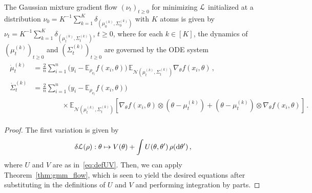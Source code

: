 \documentclass{custom}
\begin{document}
\begin{theorem} \label{thm:regression-gaussian-gmm}
The Gaussian mixture gradient
flow $(\nu_{t})_{t\geq0}$ for minimizing $\EuScript{L}$ initialized at a
distribution $\nu_{0}=K^{-1}\sum_{k=1}^{K}\delta_{(\mu_{0}^{(k)},\Sigma_{0}^{(k)})}$
with $K$ atoms is given by $\nu_{t}= K^{-1} \sum_{k=1}^{K}\delta_{(\mu_t^{(k)},\Sigma_t^{(k)})}$, $t\ge 0$,
where for each $k\in[K]$, the dynamics of $(\mu_{t}^{(k)})_{t\geq0}$
and $(\Sigma_{t}^{(k)})_{t\geq0}$ are governed by the ODE system
\begin{align*}
\boxed{\begin{aligned}
\dot{\mu}_{t}^{(k)} & =\frac{2}{n}\sum_{i=1}^{n}\bigl(y_{i}-\mathbb{E}_{\rho_{\nu_{t}}} f(x_{i},\theta)\bigr)\,\mathbb{E}_{\mathcal{N}(\mu_{t}^{(k)},\Sigma_{t}^{(k)})} \nabla_{\theta}f(x_{i},\theta)\,,\\
\dot{\Sigma}_{t}^{(k)} & =\frac{2}{n}\sum_{i=1}^{n}\bigl(y_{i}-\mathbb{E}_{\rho_{\nu_{t}}} f(x_{i},\theta)\bigr)\\
&\qquad\qquad{}\times \mathbb{E}_{\mathcal{N}(\mu_{t}^{(k)},\Sigma_{t}^{(k)})}[\nabla_{\theta}f(x_{i},\theta)\otimes(\theta-\mu_{t}^{(k)})+(\theta-\mu_{t}^{(k)})\otimes\nabla_{\theta}f(x_{i},\theta)]\,.
\end{aligned}}
\end{align*}
\end{theorem}
\begin{proof}
    The first variation is given by
    \begin{align*}
        \delta \EuScript{L}(\rho) : \theta \mapsto V(\theta) + \int U(\theta,\theta')\,\rho(\mathrm d \theta')\,,
    \end{align*}
    where $U$ and $V$ are as in~\eqref{eq:defUV}.
    Then, we can apply Theorem~\ref{thm:gmm_flow}, which is seen to yield the desired equations after substituting in the definitions of $U$ and $V$ and performing integration by parts.
\end{proof}
\end{document}

